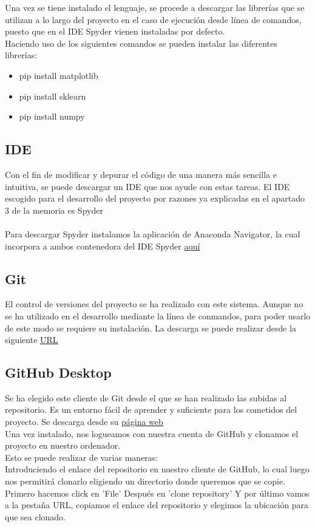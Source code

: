 Una vez se tiene instalado el lenguaje, se procede a descargar las librerías que se utilizan a lo largo del proyecto en el caso de ejecución desde línea de comandos, puesto que en el IDE Spyder vienen instaladas por defecto.\\
Haciendo uso de los siguientes comandos se pueden instalar las diferentes librerías:\\
\begin{itemize}
	\item pip install matplotlib
	\item pip install sklearn
	\item pip install numpy
\end{itemize}


\subsection{IDE}
Con el fin de modificar y depurar el código de una manera más sencilla e intuitiva, se puede descargar un IDE que nos ayude con estas tareas. El IDE escogido para el desarrollo del proyecto por razones ya explicadas en el apartado 3 de la memoria es Spyder\\
\\
Para descargar Spyder instalamos la aplicación de Anaconda Navigator, la cual incorpora a ambos contenedora del IDE Spyder \href{https://anaconda.org/anaconda/anaconda-navigator}{aquí} \\


\subsection{Git}
El control de versiones del proyecto se ha realizado con este sistema. Aunque no se ha utilizado en el desarrollo mediante la línea de conmandos, para poder usarlo de este modo se requiere su instalación. La descarga se puede realizar desde la siguiente \href{https://git-scm.com/}{URL}\\


\subsection{GitHub Desktop}
Se ha elegido este cliente de Git desde el que se han realizado las subidas al repositorio. Es un entorno fácil de aprender y suficiente para los cometidos del proyecto. Se descarga desde su \href{https://desktop.github.com/}{página web}
\\
Una vez instalado, nos logueamos con nuestra cuenta de GitHub y clonamos el proyecto en nuestro ordenador.\\ Esto se puede realizar de varias maneras:\\
Introduciendo el enlace del repositorio en nuestro cliente de GitHub, lo cual luego nos permitirá clonarlo eligiendo un directorio donde queremos que se copie.
Primero hacemos click en 'File'
Después en 'clone repository'
Y por último vamos a la pestaña URL, copiamos el enlace del repositorio y elegimos la ubicación para que sea clonado.

